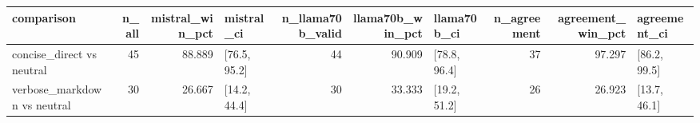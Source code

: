 \begin{tabular}{lrrlrrlrrl}
\toprule
comparison & n_all & mistral_win_pct & mistral_ci & n_llama70b_valid & llama70b_win_pct & llama70b_ci & n_agreement & agreement_win_pct & agreement_ci \\
\midrule
concise_direct vs neutral & 45 & 88.889 & [76.5, 95.2] & 44 & 90.909 & [78.8, 96.4] & 37 & 97.297 & [86.2, 99.5] \\
verbose_markdown vs neutral & 30 & 26.667 & [14.2, 44.4] & 30 & 33.333 & [19.2, 51.2] & 26 & 26.923 & [13.7, 46.1] \\
\bottomrule
\end{tabular}
